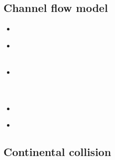 \subsection{Channel flow model} 

\begin{scriptsize}
\begin{itemize}
\item[\twothousand] 
\textcite{clro00} \\
\item[\twothousandfour] 
\textcite{bejn04} \\
\textcite{jabm04} \\
\item[\twothousandsix] 
\textcite{jabn06} \\
\textcite{mebe06} \\
\textcite{benj06} \\
\item[\twothousandseven] 
\textcite{jabn07} \\
\item[\twothousandeleven] 
\textcite{jabe11} \\
\end{itemize}
\end{scriptsize}

\subsection*{Continental collision} 

